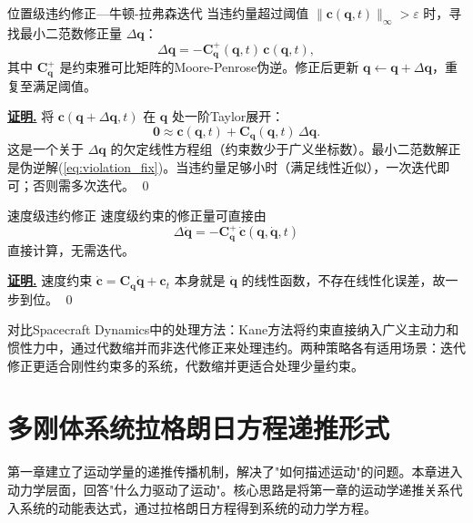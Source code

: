 \documentclass[10pt,a4paper]{book}
\theoremstyle{thmstyle}
\theoremstyle{defstyle}
\theoremstyle{prostyle}
\renewenvironment{proof}[1][证明]{\par{\kaishu \underline{\textbf{#1.}}} \;\fangsong}{\qed\par}
\renewcommand{\vec}[1]{\bm{#1}}
\newcommand{\mat}[1]{\bm{#1}}
\begin{document}
\begin{myTheorem}{位置级违约修正---牛顿-拉弗森迭代}
当违约量超过阈值 $\| \vec{c}(\vec{q}, t) \|_\infty > \varepsilon$ 时，寻找最小二范数修正量 $\Delta\vec{q}$：
\begin{equation}
\Delta\vec{q} = -\mat{C}_{\vec{q}}^{+}(\vec{q}, t)\,\vec{c}(\vec{q}, t),
\label{eq:violation_fix}
\end{equation}
其中 $\mat{C}_{\vec{q}}^{+}$ 是约束雅可比矩阵的Moore-Penrose伪逆。修正后更新 $\vec{q} \leftarrow \vec{q} + \Delta\vec{q}$，重复至满足阈值。
\end{myTheorem}

\begin{proof}
将 $\vec{c}(\vec{q} + \Delta\vec{q}, t)$ 在 $\vec{q}$ 处一阶Taylor展开：
\[
\vec{0} \approx \vec{c}(\vec{q}, t) + \mat{C}_{\vec{q}}(\vec{q}, t)\,\Delta\vec{q}.
\]
这是一个关于 $\Delta\vec{q}$ 的欠定线性方程组（约束数少于广义坐标数）。最小二范数解正是伪逆解(\ref{eq:violation_fix})。当违约量足够小时（满足线性近似），一次迭代即可；否则需多次迭代。
\end{proof}

\begin{myTheorem}{速度级违约修正}
速度级约束的修正量可直接由
\begin{equation}
\Delta\dot{\vec{q}} = -\mat{C}_{\vec{q}}^{+}\,\dot{\vec{c}}(\vec{q},\dot{\vec{q}},t)
\label{eq:vel_fix}
\end{equation}
直接计算，无需迭代。
\end{myTheorem}

\begin{proof}
速度约束 $\dot{\vec{c}} = \mat{C}_{\vec{q}}\dot{\vec{q}} + \vec{c}_t$ 本身就是 $\dot{\vec{q}}$ 的线性函数，不存在线性化误差，故一步到位。
\end{proof}

对比Spacecraft Dynamics中的处理方法：Kane方法将约束直接纳入广义主动力和惯性力中，通过代数缩并而非迭代修正来处理违约。两种策略各有适用场景：迭代修正更适合刚性约束多的系统，代数缩并更适合处理少量约束。


\chapter{多刚体系统拉格朗日方程递推形式}

第一章建立了运动学量的递推传播机制，解决了"如何描述运动"的问题。本章进入动力学层面，回答"什么力驱动了运动"。核心思路是将第一章的运动学递推关系代入系统的动能表达式，通过拉格朗日方程得到系统的动力学方程。
\end{document}

